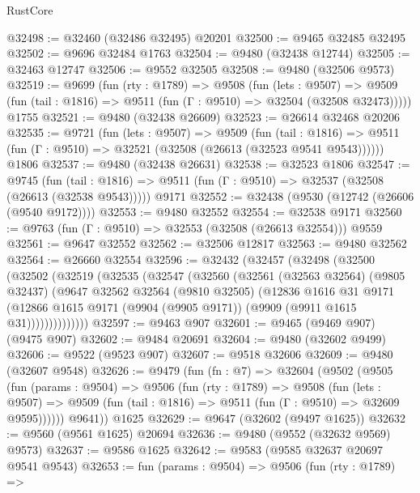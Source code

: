 \begin{lexlean}{RustCore}
\begin{coremodule}
@32498 := @32460 (@32486 @32495) @20201
@32500 := @9465 @32485 @32495
@32502 := @9696 @32484 @1763
@32504 := @9480 (@32438 @12744)
@32505 := @32463 @12747
@32506 := @9552 @32505
@32508 := @9480 (@32506 @9573)
@32519 := @9699
    (fun (rty : @1789) =>
    @9508
      (fun (lets : @9507) =>
      @9509 (fun (tail : @1816) => @9511 (fun (Γ : @9510) => @32504 (@32508 @32473)))))
    @1755
@32521 := @9480 (@32438 @26609)
@32523 := @26614 @32468 @20206
@32535 := @9721
    (fun (lets : @9507) =>
    @9509
      (fun (tail : @1816) =>
      @9511 (fun (Γ : @9510) => @32521 (@32508 (@26613 (@32523 @9541 @9543))))))
    @1806
@32537 := @9480 (@32438 @26631)
@32538 := @32523 @1806
@32547 := @9745
    (fun (tail : @1816) => @9511 (fun (Γ : @9510) => @32537 (@32508 (@26613 (@32538 @9543)))))
    @9171
@32552 := @32438 (@9530 (@12742 (@26606 (@9540 @9172))))
@32553 := @9480 @32552
@32554 := @32538 @9171
@32560 := @9763 (fun (Γ : @9510) => @32553 (@32508 (@26613 @32554))) @9559
@32561 := @9647 @32552
@32562 := @32506 @12817
@32563 := @9480 @32562
@32564 := @26660 @32554
@32596 := @32432
    (@32457
      (@32498
        (@32500
          (@32502
            (@32519
              (@32535
                (@32547
                  (@32560
                    (@32561
                      (@32563 @32564)
                      (@9805 @32437)
                      (@9647
                        @32562
                        @32564
                        (@9810 @32505)
                        (@12836
                          @1616
                          @31
                          @9171
                          (@12866
                            @1615
                            @9171
                            (@9904 (@9905 @9171))
                            (@9909 (@9911 @1615 @31))))))))))))))
@32597 := @9463 @907
@32601 := @9465 (@9469 @907) (@9475 @907)
@32602 := @9484 @20691
@32604 := @9480 (@32602 @9499)
@32606 := @9522 (@9523 @907)
@32607 := @9518 @32606
@32609 := @9480 (@32607 @9548)
@32626 := @9479
    (fun (fn : @7) =>
    @32604
      (@9502
        (@9505
          (fun (params : @9504) =>
          @9506
            (fun (rty : @1789) =>
            @9508
              (fun (lets : @9507) =>
              @9509 (fun (tail : @1816) => @9511 (fun (Γ : @9510) => @32609 @9595))))))
        @9641))
    @1625
@32629 := @9647 (@32602 (@9497 @1625))
@32632 := @9560 (@9561 @1625) @20694
@32636 := @9480 (@9552 (@32632 @9569) @9573)
@32637 := @9586 @1625
@32642 := @9583 (@9585 @32637 @20697 @9541 @9543)
@32653 := fun (params : @9504) =>
  @9506
    (fun (rty : @1789) =>

\end{coremodule}
\end{lexlean}
